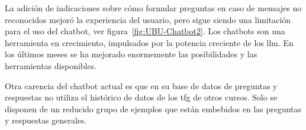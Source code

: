 
La adición de indicaciones sobre cómo formular preguntas en caso de mensajes no reconocidos  mejoró la experiencia del usuario, pero sigue siendo una limitación para el uso del chatbot, ver figura~\ref{fig:UBU-Chatbot2}. Los chatbots son una herramienta en crecimiento, impulsados por la potencia creciente de los \acrlong{llm}. En los últimos meses se ha mejorado enormemente las posibilidades y las herramientas disponibles.

Otra carencia del chatbot actual es que en su base de datos de preguntas y respuestas no utiliza el histórico de datos de los \acrshort{tfg} de otros cursos. Solo se disponen de un reducido grupo de ejemplos que están embebidos en las preguntas y respuestas generales.